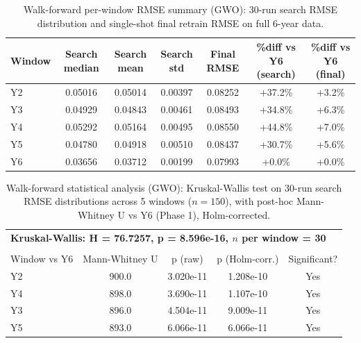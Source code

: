 \begin{table}[htbp]
\centering
\caption{Walk-forward per-window RMSE summary (GWO): 30-run search RMSE distribution and single-shot final retrain RMSE on full 6-year data.}
\label{tab:wf_rmse_summary_gwo}
\begin{tabular}{lcccccc}
\hline
Window & Search median & Search mean & Search std & Final RMSE & \%diff vs Y6 (search) & \%diff vs Y6 (final) \\
\hline
Y2   & 0.05016 & 0.05014 & 0.00397 & 0.08252 & +37.2\% & +3.2\% \\
Y3   & 0.04929 & 0.04843 & 0.00461 & 0.08493 & +34.8\% & +6.3\% \\
Y4   & 0.05292 & 0.05164 & 0.00495 & 0.08550 & +44.8\% & +7.0\% \\
Y5   & 0.04780 & 0.04918 & 0.00510 & 0.08437 & +30.7\% & +5.6\% \\
Y6   & 0.03656 & 0.03712 & 0.00199 & 0.07993 & +0.0\% & +0.0\% \\
\hline
\end{tabular}
\end{table}

\begin{table}[htbp]
\centering
\caption{Walk-forward statistical analysis (GWO): Kruskal-Wallis test on 30-run search RMSE distributions across 5 windows ($n=150$), with post-hoc Mann-Whitney U vs Y6 (Phase 1), Holm-corrected.}
\label{tab:wf_stat_gwo}
\begin{tabular}{lcccc}
\hline
\multicolumn{5}{l}{\textbf{Kruskal-Wallis: H = 76.7257, p = 8.596e-16, $n$ per window = 30}} \\\\
\hline
Window vs Y6 & Mann-Whitney U & p (raw) & p (Holm-corr.) & Significant? \\
\hline
Y2   & 900.0 & 3.020e-11 & 1.208e-10 & Yes \\
Y4   & 898.0 & 3.690e-11 & 1.107e-10 & Yes \\
Y3   & 896.0 & 4.504e-11 & 9.009e-11 & Yes \\
Y5   & 893.0 & 6.066e-11 & 6.066e-11 & Yes \\
\hline
\end{tabular}
\end{table}